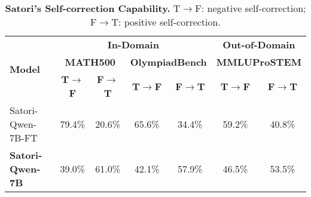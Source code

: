 \begin{table}[h]
\scriptsize
\captionsetup{font=small}
\caption{\textbf{Satori's Self-correction Capability.} T$\rightarrow$F: negative self-correction; F$\rightarrow$T: positive self-correction.}
\setlength{\tabcolsep}{5pt}
\begin{tabular}{lcccccc}
\toprule
\multirow{3}{*}{\textbf{Model}} & \multicolumn{4}{c}{\textbf{In-Domain}}                                                                            & \multicolumn{2}{c}{\textbf{Out-of-Domain}}              \\ \cmidrule[0.2pt]{2-7} 
                                & \multicolumn{2}{c}{\textbf{MATH500}}                    & \multicolumn{2}{c}{\textbf{OlympiadBench}}              & \multicolumn{2}{c}{\textbf{MMLUProSTEM}}         \\
                                & \textbf{T$\rightarrow$F} & \textbf{F$\rightarrow$T} & \textbf{T$\rightarrow$F} & \textbf{F$\rightarrow$T} & \textbf{T$\rightarrow$F} & \textbf{F$\rightarrow$T} \\ \midrule[0.5pt]
Satori-Qwen-7B-FT                  & 79.4\%                    & 20.6\%                    & 65.6\%                    & 34.4\%                    & 59.2\%                    & 40.8\%                    \\
\textbf{Satori-Qwen-7B}                     & 39.0\%                       & 61.0\%                       & 42.1\%                    & 57.9\%                    & 46.5\%                    & 53.5\%                    \\ \bottomrule
\end{tabular}
\label{table:finegrain-reflect}
\end{table}